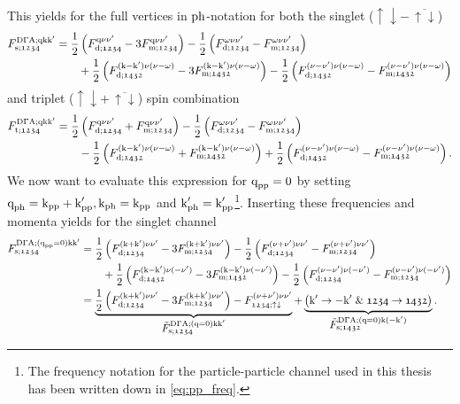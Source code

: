 \documentclass[../../main.tex]{subfiles}
\begin{document}
This yields for the full vertices in $\text{ph}$-notation for both the singlet ($\uparrow\downarrow-\,\overline{\uparrow\downarrow}$)
\begin{align}
\begin{split}
	F_{\text{s};\mathfrak{1234}}^{\text{D}\Gamma\text{A};\text{q}\text{k}\text{k}'}&=\frac12\left (F_{\text{d};\mathfrak{1234}}^{\text{q}\nu\nu'}-3F_{\text{m};\mathfrak{1234}}^{\text{q}\nu\nu'}\right )-\frac12\left (F_{\text{d};\mathfrak{1234}}^{\omega\nu\nu'}-F_{\text{m};\mathfrak{1234}}^{\omega\nu\nu'}\right )\\
	&\qquad+\frac12\left (F_{\text{d};\mathfrak{1432}}^{(\text{k}-\text{k}')\nu(\nu-\omega)}-3F_{\text{m};\mathfrak{1432}}^{(\text{k}-\text{k}')\nu(\nu-\omega)}\right )-\frac12\left (F_{\text{d};\mathfrak{1432}}^{(\nu-\nu')\nu(\nu-\omega)}-F_{\text{m};\mathfrak{1432}}^{(\nu-\nu')\nu(\nu-\omega)}\right )
\end{split}
\end{align}
and triplet ($\uparrow\downarrow+\,\overline{\uparrow\downarrow}$) spin combination
\begin{align}
\begin{split}
	F_{\text{t};\mathfrak{1234}}^{\text{D}\Gamma\text{A};\text{q}\text{k}\text{k}'}&=\frac12\left (F_{\text{d};\mathfrak{1234}}^{\text{q}\nu\nu'}+F_{\text{m};\mathfrak{1234}}^{\text{q}\nu\nu'}\right )-\frac12\left (F_{\text{d};\mathfrak{1234}}^{\omega\nu\nu'}-F_{\text{m};\mathfrak{1234}}^{\omega\nu\nu'}\right )\\
	&\qquad-\frac12\left (F_{\text{d};\mathfrak{1432}}^{(\text{k}-\text{k}')\nu(\nu-\omega)}+F_{\text{m};\mathfrak{1432}}^{(\text{k}-\text{k}')\nu(\nu-\omega)}\right )+\frac12\left (F_{\text{d};\mathfrak{1432}}^{(\nu-\nu')\nu(\nu-\omega)}-F_{\text{m};\mathfrak{1432}}^{(\nu-\nu')\nu(\nu-\omega)}\right ).
\end{split}
\end{align}
We now want to evaluate this expression for $\text{q}_{\text{pp}}=0$ by setting $\text{q}_{\text{ph}}=\text{k}_{\text{pp}}+\text{k}'_{\text{pp}}, \text{k}_{\text{ph}}=\text{k}_{\text{pp}}$ and $\text{k}'_{\text{ph}}=\text{k}'_{\text{pp}}$\footnote{The frequency notation for the particle-particle channel used in this thesis has been written down in \eqref{eq:pp_freq}.}. Inserting these frequencies and momenta yields for the singlet channel
\begin{align}\label{eq:ladder_f_sing}
\begin{split}
	F_{\text{s};\mathfrak{1234}}^{\text{D}\Gamma\text{A};(\text{q}_{\text{pp}}=0)\text{k}\text{k}'}&=\frac12\left (F_{\text{d};\mathfrak{1234}}^{(\text{k}+\text{k}')\nu\nu'}-3F_{\text{m};\mathfrak{1234}}^{(\text{k}+\text{k}')\nu\nu'}\right )-\frac12\left (F_{\text{d};\mathfrak{1234}}^{(\nu+\nu')\nu\nu'}-F_{\text{m};\mathfrak{1234}}^{(\nu+\nu')\nu\nu'}\right )\\
	&\qquad+\frac12\left (F_{\text{d};\mathfrak{1432}}^{(\text{k}-\text{k}')\nu(-\nu')}-3F_{\text{m};\mathfrak{1432}}^{(\text{k}-\text{k}')\nu(-\nu')}\right )-\frac12\left (F_{\text{d};\mathfrak{1234}}^{(\nu-\nu')\nu(-\nu')}-F_{\text{m};\mathfrak{1234}}^{(\nu-\nu')\nu(-\nu')}\right )\\
	&=\underbrace{\frac12\left (F_{\text{d};\mathfrak{1234}}^{(\text{k}+\text{k}')\nu\nu'}-3F_{\text{m};\mathfrak{1234}}^{(\text{k}+\text{k}')\nu\nu'}\right )-F_{\mathfrak{1234};\uparrow\downarrow}^{(\nu+\nu')\nu\nu'}}_{\textstyle\tilde{F}_{\text{s};\mathfrak{1234}}^{\text{D}\Gamma\text{A};(\text{q}=0)\text{k}\text{k}'}}+ \underbrace{\left (\text{k}'\rightarrow -\text{k}'\;\&\; \mathfrak{1234}\rightarrow\mathfrak{1432}\right )}_{\textstyle\tilde{F}_{\text{s};\mathfrak{1432}}^{\text{D}\Gamma\text{A};(\text{q}=0)\text{k}(-\text{k}')}}.
\end{split}
\end{align}
\end{document}
